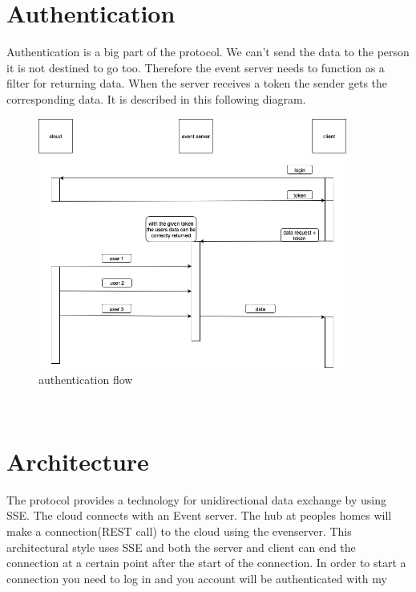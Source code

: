 \documentclass{article}
\begin{document}
\section{Authentication}
Authentication is a big part of the protocol. We  can't send the data to the person it is not destined to go too. Therefore the event server needs to function as a filter for returning data. When the server receives a token the sender gets the corresponding data. It is described in this following diagram.\\
	\begin{figure}[H]
	\includegraphics[width=4in]{pictures/authenticationFlow.png}
	\caption[Optional caption]{authentication flow}
	\end{figure}\\


\section{Architecture}\label{sec:architecture}
The protocol provides a technology for unidirectional data exchange by using SSE. The cloud connects with an Event server. The hub at peoples homes will make a connection(REST call) to the cloud using the evenserver. This architectural style uses SSE and both the server and client can end the connection at a certain point after the start of the connection.  In order to start a connection you need to log in and you account will be authenticated with my \\
\\
\end{document}
